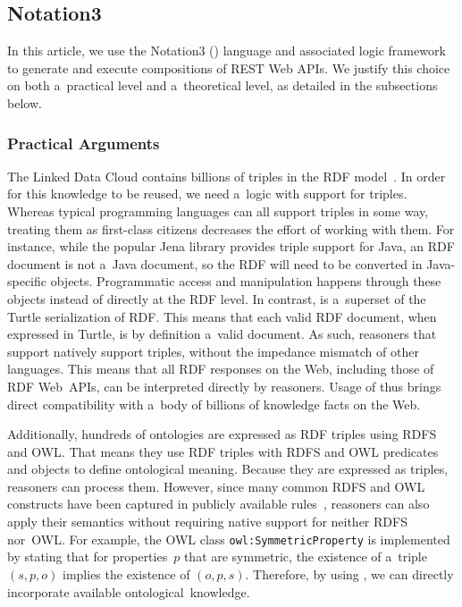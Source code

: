 \subsection{Notation3}
\label{subsec:TechnologiesN3}
In this article, we use the Notation3 (\nthree) language and associated logic framework
to generate and execute compositions of REST Web APIs.
We justify this choice on both a~practical level
and a~theoretical level, as detailed in the subsections below.

\subsubsection{Practical Arguments}
The Linked Data Cloud contains billions of triples in the RDF model~\cite{LODCloud}.
In order for this knowledge to be reused,
we need a~logic with support for triples.
Whereas typical programming languages can all support triples in some way,
treating them as first-class citizens decreases the effort of working with them.
For instance, while the popular Jena library provides triple support for Java,
an RDF document is not a~Java document,
so the RDF will need to be converted in Java-specific objects.
Programmatic access and manipulation happens through these objects
instead of directly at the RDF level.
In contrast, \nthree is a~superset of the Turtle serialization of RDF.
This means that each valid RDF document, when expressed in Turtle,
is by definition a~valid \nthree document.
As such, reasoners that support \nthree natively support triples,
without the impedance mismatch of other languages.
This means that all RDF responses on the Web,
including those of RDF Web~APIs,
can be interpreted directly by \nthree reasoners.
Usage of \nthree thus brings direct compatibility
with a~body of billions of knowledge facts on the Web.

Additionally, hundreds of ontologies are expressed as RDF triples using RDFS and OWL.
That means they use RDF triples with RDFS and OWL predicates and objects
to define ontological meaning.
Because they are expressed as triples, \nthree reasoners can process them.
However, since many common RDFS and OWL constructs
have been captured in publicly available \nthree rules~\cite{EYE},
\nthree reasoners can also apply their semantics
without requiring native support for neither RDFS nor~OWL.
For example, the OWL class \verb!owl:SymmetricProperty!
is implemented by stating that for properties~$p$ that are symmetric,
the existence of a~triple $(s, p, o)$ implies the existence of $(o, p, s)$.
Therefore, by using \nthree, we can directly incorporate available ontological~knowledge.


